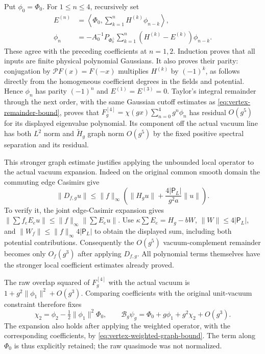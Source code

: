 Put $\phi_0=\Phi_0$. For $1\le n\le4$, recursively set
\begin{align}
 E^{(n)}&=\left\langle\Phi_0,
                   \sum_{k=1}^nH^{(k)}\phi_{n-k}\right\rangle,\nonumber\\
 \phi_n&=-A_0^{-1}P_{\Phi_0^\perp}
             \sum_{k=1}^n(H^{(k)}-E^{(k)})\phi_{n-k}.
       \label{eq:vertex-fourth-quasimode}
\end{align}
These agree with the preceding coefficients at $n=1,2$.
Induction proves that all inputs are finite physical polynomial
Gaussians. It also proves their parity: conjugation by
$\mathcal P F(x)=F(-x)$ multiplies $H^{(k)}$ by $(-1)^k$,
as follows directly from the homogeneous coefficient degrees in
the fields and potential. Hence $\phi_n$ has parity $(-1)^n$
and $E^{(1)}=E^{(3)}=0$. Taylor's integral remainder through the
next order, with the same Gaussian cutoff estimates as
\eqref{eq:vertex-remainder-bound}, proves that
$F_g^{[4]}=\chi(gx)\sum_{n=0}^4g^n\phi_n$ has residual $O(g^5)$
for its displayed eigenvalue polynomial. Its component off the actual
vacuum line has both $L^2$ norm and $\widetilde H_g$ graph norm
$O(g^5)$ by the fixed positive spectral separation and its residual.

This stronger graph estimate justifies applying the unbounded local
operator to the actual vacuum expansion. Indeed on the original
common smooth domain the commuting edge Casimirs give
\begin{equation}\label{eq:vertex-weighted-graph-bound}
 \|D_{f,g}u\|\le\|f\|_\infty
           \left(\|H_gu\|+\frac{4|\mathsf P_L|}{g^2a}\|u\|\right).
\end{equation}
To verify it, the joint edge-Casimir expansion gives
$\|\sum f_eE_eu\|\le\|f\|_\infty\|\sum E_eu\|$.
Use $\kappa\sum E_e=H_g-bW$,
$\|W\|\le4|\mathsf P_L|$, and
$\|W_f\|\le\|f\|_\infty4|\mathsf P_L|$ to obtain
the displayed sum, including both potential contributions.
Consequently the $O(g^5)$ vacuum-complement remainder becomes only
$O_f(g^3)$ after applying $D_{f,g}$. All polynomial terms themselves
have the stronger local coefficient estimates already proved.

The raw overlap squared of $F_g^{[4]}$ with the actual vacuum is
$1+g^2\|\phi_1\|^2+O(g^3)$. Comparing coefficients with the
original unit-vacuum constraint therefore fixes
\[
 \chi_2=\phi_2-\tfrac12\|\phi_1\|^2\Phi_0,
 \qquad \mathcal B_g\psi_g
       =\Phi_0+g\phi_1+g^2\chi_2+O(g^3).
\]
The expansion also holds after applying the weighted operator, with
the corresponding coefficients, by
\eqref{eq:vertex-weighted-graph-bound}. The term along $\Phi_0$
is thus explicitly retained; the raw quasimode was not normalized.

